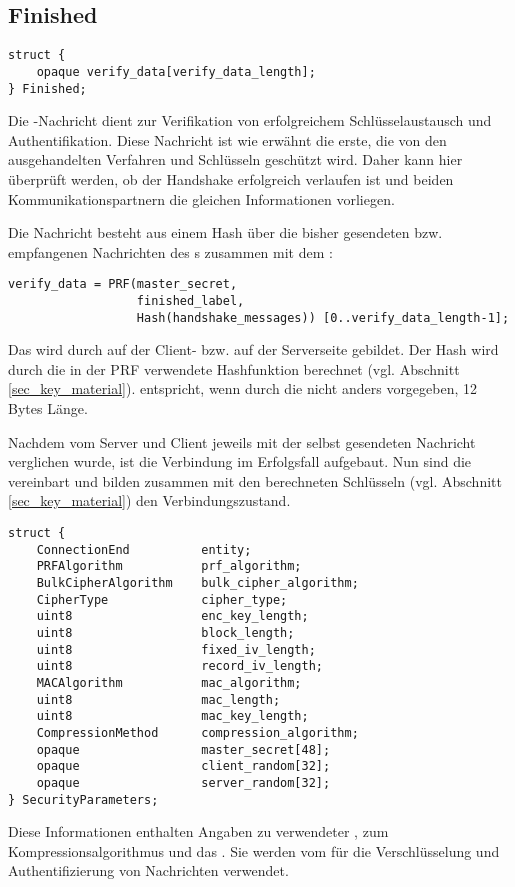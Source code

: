 \subsection*{Finished}

\begin{lstlisting}
struct {
	opaque verify_data[verify_data_length];
} Finished;
\end{lstlisting}

Die \finished{}-Nachricht dient zur Verifikation von erfolgreichem Schlüsselaustausch und Authentifikation. Diese Nachricht ist wie erwähnt die erste, die von den ausgehandelten Verfahren und Schlüsseln geschützt wird. Daher kann hier überprüft werden, ob der Handshake erfolgreich verlaufen ist und beiden Kommunikationspartnern die gleichen Informationen vorliegen.

Die Nachricht besteht aus einem Hash über die bisher gesendeten bzw. empfangenen Nachrichten des \handshakeprotocol{}s zusammen mit dem \mastersecret{}:

\begin{lstlisting}
verify_data = PRF(master_secret, 
				  finished_label, 
				  Hash(handshake_messages)) [0..verify_data_length-1];
\end{lstlisting}

Das  wird durch  auf der Client- bzw.  auf der Serverseite gebildet. Der Hash wird durch die in der PRF verwendete Hashfunktion berechnet (vgl. Abschnitt \ref{sec_key_material}).   entspricht, wenn durch die \ciphersuite{} nicht anders vorgegeben, 12 Bytes Länge.

Nachdem  vom Server und Client jeweils mit der selbst gesendeten Nachricht verglichen wurde, ist die Verbindung im Erfolgsfall aufgebaut. Nun sind die  vereinbart und bilden zusammen mit den berechneten Schlüsseln (vgl. Abschnitt \ref{sec_key_material}) den Verbindungszustand. 
\begin{lstlisting}
struct {
	ConnectionEnd          entity;
	PRFAlgorithm           prf_algorithm;
	BulkCipherAlgorithm    bulk_cipher_algorithm;
	CipherType             cipher_type;
	uint8                  enc_key_length;
	uint8                  block_length;
	uint8                  fixed_iv_length;
	uint8                  record_iv_length;
	MACAlgorithm           mac_algorithm;
	uint8                  mac_length;
	uint8                  mac_key_length;
	CompressionMethod      compression_algorithm;
	opaque                 master_secret[48];
	opaque                 client_random[32];
	opaque                 server_random[32];
} SecurityParameters;
\end{lstlisting}
Diese Informationen enthalten Angaben zu verwendeter \ciphersuite{}, zum Kompressionsalgorithmus und das \mastersecret{}. Sie werden vom \recordprotocol{} für die Verschlüsselung und Authentifizierung von Nachrichten verwendet.

